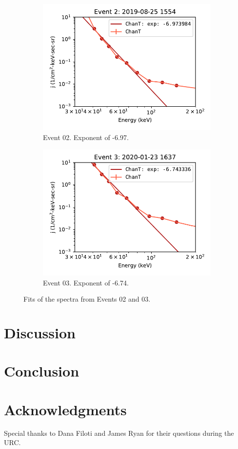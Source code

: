 \documentclass[letterpaper,11pt]{article}
\begin{document}
\begin{figure}
\centering
\begin{subfigure}{.45\textwidth}
\centering
\includegraphics[width=1.\linewidth]{figures/spectrum_02.pdf}
\caption{Event 02.  Exponent of -6.97.}
\end{subfigure}
\begin{subfigure}{.45\textwidth}
\centering
\includegraphics[width=1.\linewidth]{figures/spectrum_03.pdf}
\caption{Event 03.  Exponent of -6.74.}
\end{subfigure}
\caption{Fits of the spectra from Events 02 and 03.}
\label{fig:naive_fits}
\end{figure}



\section{Discussion}
\label{sec:discussion}



\section{Conclusion}
\label{sec:conclusion}

\section{Acknowledgments}
Special thanks to Dana Filoti and James Ryan for their questions during the URC.



%


\end{document}
